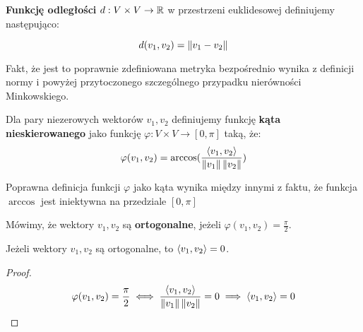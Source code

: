 \begin{definition}
\textbf{Funkcję odległości} \(d: V \times V \rightarrow \mathbb{R} \) w przestrzeni euklidesowej definiujemy następująco: 

\[ 
    d(v_1, v_2) = \left\Vert v_1 - v_2 \right\Vert 
\]

Fakt, że jest to poprawnie zdefiniowana metryka bezpośrednio wynika z definicji normy i powyżej przytoczonego szczególnego przypadku nierówności Minkowskiego.
\end{definition}

\begin{definition}
    Dla pary niezerowych wektorów \(v_1, v_2\) definiujemy funkcję \textbf{kąta nieskierowanego} jako funkcję \(\varphi: V \times V \rightarrow [0, \pi]\) taką, że:
    \[
        \varphi(v_1, v_2) = \arccos(\frac{\langle v_1, v_2 \rangle}{\left\Vert v_1 \right\Vert\left\Vert v_2 \right\Vert})
    \]

    Poprawna definicja funkcji \(\varphi\) jako kąta wynika między innymi z faktu, że funkcja \(\arccos\) jest iniektywna na przedziale \([0, \pi]\)
\end{definition}

\begin{definition}[Ortogonalność]
Mówimy, że wektory \(v_1, v_2\) są \textbf{ortogonalne}, jeżeli \(\varphi(v_1, v_2) = \frac{\pi}{2}\).
\end{definition}
\begin{fact}
Jeżeli wektory \(v_1, v_2\) są ortogonalne, to \( \langle v_1, v_2 \rangle = 0\).
\end{fact}
\begin{proof}
\[
    \varphi(v_1, v_2) = \frac{\pi}{2} \iff \frac{\langle v_1, v_2 \rangle}{\left\Vert v_1 \right\Vert\left\Vert v_2 \right\Vert} = 0 \implies \langle v_1, v_2 \rangle = 0
\]
\end{proof}

